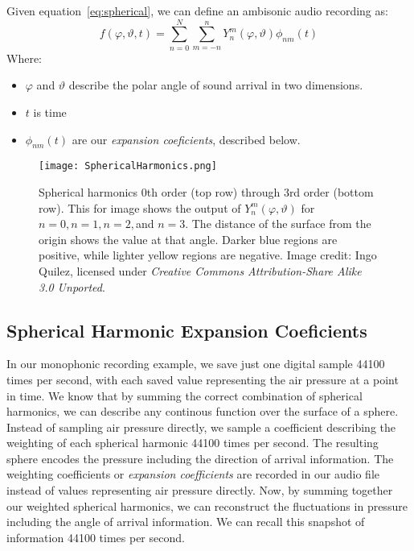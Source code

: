 Given equation~\ref{eq:spherical}, we can define an ambisonic
audio recording as:
\begin{equation}
f(\varphi,\vartheta,t)=\sum\limits_{n=0}^N\sum\limits_{m=-n}^nY_n^m(\varphi,\vartheta)\phi_{nm}(t)
\label{eq:ambisonics}
\end{equation}
Where:
\begin{itemize}
\item $\varphi$ and $\vartheta$ describe the polar angle of sound
  arrival in two dimensions.
\item $t$ is time
\item $\phi_{nm}(t)$ are our \textit{expansion coeficients}, described
  below.
\end{itemize}
\begin{figure}[]
  \texttt{[image: SphericalHarmonics.png]}
  \caption{Spherical harmonics $0$th order (top row) through $3$rd
    order (bottom row). This for image shows the output of
    $Y_{n}^{m}(\varphi,\vartheta)$ for $n=0,n=1,n=2,$and $n=3$. The
    distance of the surface from the origin shows the value at that
    angle. Darker blue regions are positive, while lighter yellow
    regions are negative. Image credit: Ingo Quilez, licensed under
    \textit{Creative Commons Attribution-Share Alike 3.0 Unported}.}
  \label{fig:spherical-harmonics}
\end{figure}

\subsection{Spherical Harmonic Expansion Coeficients}
\label{sec:spher-harm-expans}
In our monophonic recording example, we save just one digital sample
44100 times per second, with each saved value representing the air
pressure at a point in time. We know that by summing the correct
combination of spherical harmonics, we can describe any continous
function over the surface of a sphere. Instead of sampling air
pressure directly, we sample a coefficient describing the weighting of
each spherical harmonic 44100 times per second. The resulting sphere
encodes the pressure including the direction of arrival
information. The weighting coefficients or \textit{expansion
  coefficients} are recorded in our audio file instead of values
representing air pressure directly. Now, by summing together our
weighted spherical harmonics, we can reconstruct the fluctuations in
pressure including the angle of arrival information. We can recall
this snapshot of information 44100 times per second.

